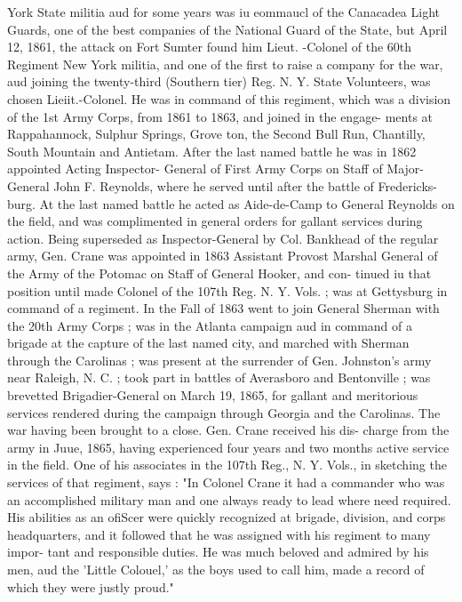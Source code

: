 \documentclass[oneside]{book}
\begin{document}
York State militia aud for some years was iu eommaucl of the 
Canacadea Light Guards, one of the best companies of the 
National Guard of the State, but April 12, 1861, the attack 
on Fort Sumter found him Lieut. -Colonel of the 60th Regiment 
New York militia, and one of the first to raise a company for 
the war, aud joining the twenty-third (Southern tier) Reg. N. 
Y. State Volunteers, was chosen Lieiit.-Colonel. He was in 
command of this regiment, which was a division of the 1st 
Army Corps, from 1861 to 1863, and joined in the engage- 
ments at Rappahannock, Sulphur Springs, Grove ton, the Second 
Bull Run, Chantilly, South Mountain and Antietam. After the 
last named battle he was in 1862 appointed Acting Inspector- 
General of First Army Corps on Staff of Major-General John F. 
Reynolds, where he served until after the battle of Fredericks- 
burg. At the last named battle he acted as Aide-de-Camp to 
General Reynolds on the field, and was complimented in general 
orders for gallant services during action. Being superseded as 
Inspector-General by Col. Bankhead of the regular army, Gen. 
Crane was appointed in 1863 Assistant Provost Marshal General 
of the Army of the Potomac on Staff of General Hooker, and con- 
tinued iu that position until made Colonel of the 107th Reg. N. 
Y. Vols. ; was at Gettysburg in command of a regiment. In the 
Fall of 1863 went to join General Sherman with the 20th Army 
Corps ; was in the Atlanta campaign aud in command of a brigade 
at the capture of the last named city, and marched with Sherman 
through the Carolinas ; was present at the surrender of Gen. 
Johnston's army near Raleigh, N. C. ; took part in battles of 
Averasboro and Bentonville ; was brevetted Brigadier-General on 
March 19, 1865, for gallant and meritorious services rendered 
during the campaign through Georgia and the Carolinas. The 
war having been brought to a close. Gen. Crane received his dis- 
charge from the army in Juue, 1865, having experienced four 
years and two months active service in the field. One of his 
associates in the 107th Reg., N. Y. Vols., in sketching the services 
of that regiment, says : "In Colonel Crane it had a commander 
who was an accomplished military man and one always ready to 
lead where need required. His abilities as an ofiScer were quickly 
recognized at brigade, division, and corps headquarters, and it 
followed that he was assigned with his regiment to many impor- 
tant and responsible duties. He was much beloved and admired 
by his men, aud the 'Little Colouel,' as the boys used to call 
him, made a record of which they were justly proud." 
\end{document}
